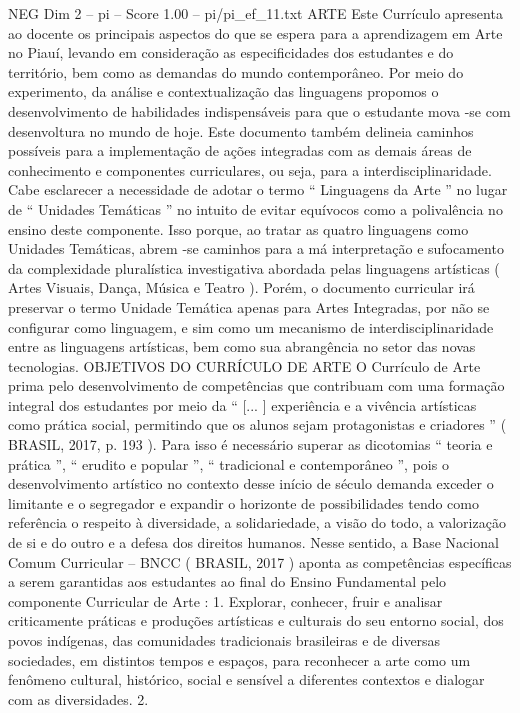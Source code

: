 \begin{textsample}{NEG Dim 2 – pi – Score 1.00 – pi/pi\_ef\_11.txt}  \label{ex:f2_neg_197}
ARTE Este Currículo apresenta ao docente os principais aspectos do que se espera para a aprendizagem em Arte no Piauí, levando em consideração as especificidades dos estudantes e do território, bem como as demandas do mundo contemporâneo.
Por meio do experimento, da análise e contextualização das linguagens propomos o desenvolvimento de habilidades indispensáveis para que o estudante mova -se com desenvoltura no mundo de hoje.
Este documento também delineia caminhos possíveis para a implementação de ações integradas com as demais áreas de conhecimento e componentes curriculares, ou seja, para a interdisciplinaridade.
Cabe esclarecer a necessidade de adotar o termo “ Linguagens da Arte ” no lugar de “ Unidades Temáticas ” no intuito de evitar equívocos como a polivalência no ensino deste componente.
Isso porque, ao tratar as quatro linguagens como Unidades Temáticas, abrem -se caminhos para a má interpretação e sufocamento da complexidade pluralística investigativa abordada pelas linguagens artísticas ( Artes Visuais, Dança, Música e Teatro ).
Porém, o documento curricular irá preservar o termo Unidade Temática apenas para Artes Integradas, por não se configurar como linguagem, e sim como um mecanismo de interdisciplinaridade entre as linguagens artísticas, bem como sua abrangência no setor das novas tecnologias.
OBJETIVOS DO CURRÍCULO DE ARTE O Currículo de Arte prima pelo desenvolvimento de competências que contribuam com uma formação integral dos estudantes por meio da “ [... ] experiência e a vivência artísticas como prática social, permitindo que os alunos sejam protagonistas e criadores ” ( BRASIL, 2017, p. 193 ).
Para isso é necessário superar as dicotomias “ teoria e prática ”, “ erudito e popular ”, “ tradicional e contemporâneo ”, pois o desenvolvimento artístico no contexto desse início de século demanda exceder o limitante e o segregador e expandir o horizonte de possibilidades tendo como referência o respeito à diversidade, a solidariedade, a visão do todo, a valorização de si e do outro e a defesa dos direitos humanos.
Nesse sentido, a Base Nacional Comum Curricular – BNCC ( BRASIL, 2017 ) aponta as competências específicas a serem garantidas aos estudantes ao final do Ensino Fundamental pelo componente Curricular de Arte : 1.
Explorar, conhecer, fruir e analisar criticamente práticas e produções artísticas e culturais do seu entorno social, dos povos indígenas, das comunidades tradicionais brasileiras e de diversas sociedades, em distintos tempos e espaços, para reconhecer a arte como um fenômeno cultural, histórico, social e sensível a diferentes contextos e dialogar com as diversidades. 2.

\end{textsample}
